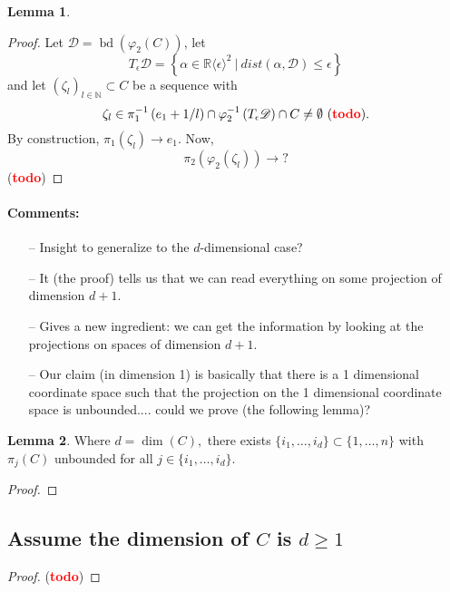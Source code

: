 \documentclass[11pt]{article}
\theoremstyle{definition}
\newtheorem{lemma}{Lemma}
\newcommand{\N}{\mathbb{N}}
\newcommand{\R}{\mathbb{R}}
\newcommand{\vp}{\varphi}
\def\td{(\textcolor{red}{{\bf todo}})}
\def\td{(\textcolor{red}{{\bf todo}}) }
\DeclareMathOperator{\bd}{bd}
\begin{document}
%
\begin{lemma}
    
\end{lemma}
\begin{proof}
Let $\mathscr{D} = \bd(\vp_2(C))$, let 
\[
T_{\epsilon}\mathscr{D} = \left\{\alpha \in \R\langle \epsilon \rangle^2~|~dist(\alpha,\mathscr{D}) \leq \epsilon \right\} 
\]
and let $(\zeta_l)_{l \in \N} \subset C$ be a sequence with 
\[
\zeta_l \in \pi_1^{-1}\left(e_1 + 1/l \right) \cap \vp_2^{-1}\left(T_{\epsilon}\mathscr{D}\right) \cap C \not = \emptyset~\td.
\]
By construction, $\pi_1(\zeta_l) \rightarrow e_1$. Now, 
\[
\pi_2(\vp_2(\zeta_l)) \rightarrow ?
\]
\td
\end{proof}
%
\paragraph*{Comments:}
\begin{itemize}
    \item[--] Insight to generalize to the $d$-dimensional case? 
    \item[--] It (the proof) tells us that we can read everything on some projection of dimension $d+1$.
    \item[--] Gives a new ingredient: we can get the information by looking at the projections on spaces of dimension $d+1.$ 
    \item[--] Our claim (in dimension 1) is basically that there is a 1 dimensional coordinate space such that the projection on the 1 dimensional coordinate space is unbounded.... could we prove (the following lemma)?
\end{itemize}



\begin{lemma}
    Where $d = \dim (C),$ there exists $\{i_1,\hdots,i_d\} \subset \{1,\hdots,n\}$ with $\pi_j(C)$ unbounded for all $j \in \{i_1,\hdots,i_d\}.$
\end{lemma}

\begin{proof}
    
\end{proof}

\subsection*{Assume the dimension of $C$ is $d\geq 1$}
\begin{proof}
\td
\end{proof}







\end{document}
